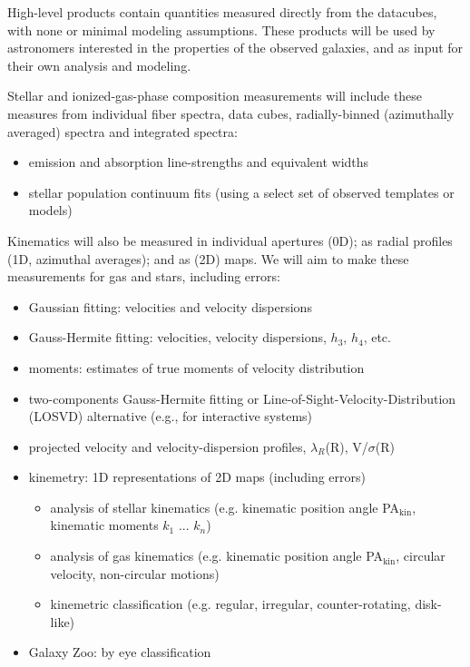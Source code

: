 \documentclass[preprint,11pt]{aastex}
\begin{document}
High-level products contain quantities measured directly from the
datacubes, with none or minimal modeling assumptions. These products
will be used by astronomers interested in the properties of the
observed galaxies, and as input for their own analysis and modeling.

\medskip
\noindent Stellar and ionized-gas-phase composition measurements will include
these measures from individual fiber spectra, data cubes,
radially-binned (azimuthally averaged) spectra and integrated spectra:

\begin{itemize}
\item emission and absorption line-strengths and equivalent widths
\item stellar population continuum fits (using a select set of
  observed templates or models)
\end{itemize}

\medskip
\noindent Kinematics will also be measured in individual apertures (0D); as
radial profiles (1D, azimuthal averages); and as (2D) maps. We will aim to make these
measurements for gas and stars, including errors:

\begin{itemize}
\item Gaussian fitting: velocities and velocity dispersions
\item Gauss-Hermite fitting: velocities, velocity dispersions, $h_3$,
  $h_4$, etc.
\item moments: estimates of true moments of velocity distribution
\item two-components Gauss-Hermite fitting or
  Line-of-Sight-Velocity-Distribution (LOSVD) alternative (e.g., for
  interactive systems)
\item projected velocity and velocity-dispersion profiles,
  $\lambda_R$(R), V/$\sigma$(R)
\item kinemetry: 1D representations of 2D maps (including errors)
\begin{itemize}
\item analysis of stellar kinematics (e.g. kinematic position angle
  PA$_\mathrm{kin}$, kinematic moments $k_1$
  ... $k_n$)
\item analysis of gas kinematics (e.g. kinematic position angle
  PA$_\mathrm{kin}$, circular velocity, non-circular motions)
\item kinemetric classification (e.g. regular, irregular,
  counter-rotating,
  disk-like)
\end{itemize}
\item Galaxy Zoo: by eye classification
\end{itemize}
\end{document}

